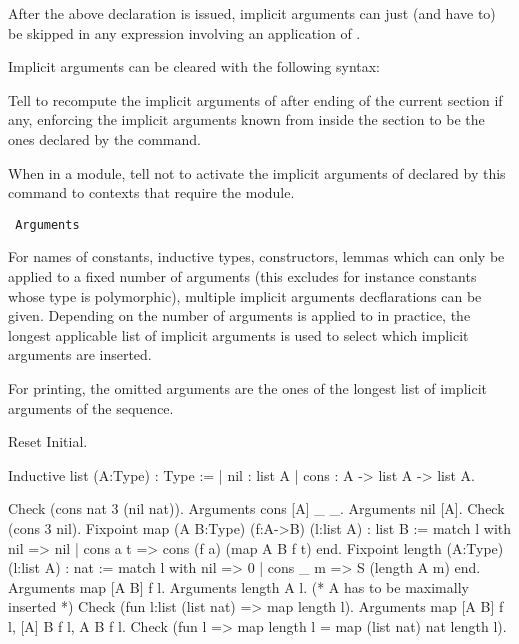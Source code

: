 After the above declaration is issued, implicit arguments can just (and
have to) be skipped in any expression involving an application of
{\qualid}.

Implicit arguments can be cleared with the following syntax:

\begin{quote}
{}
\end{quote}

\begin{Variants}
\item {}

Tell to recompute the implicit arguments of {\qualid} after ending of
the current section if any, enforcing the implicit arguments known
from inside the section to be the ones declared by the command.

\item {}

When in a module, tell not to activate the implicit arguments of
{\qualid} declared by this command to contexts that require the
module.

\item {\tt {} Arguments {\qualid} \sequence{\nelist{\possiblybracketedident}{}}{,}}

For names of constants, inductive types, constructors, lemmas which
can only be applied to a fixed number of arguments (this excludes for
instance constants whose type is polymorphic), multiple 
implicit arguments decflarations can be given. 
Depending on the number of arguments {\qualid} is applied
to in practice, the longest applicable list of implicit arguments is
used to select which implicit arguments are inserted.

For printing, the omitted arguments are the ones of the longest list
of implicit arguments of the sequence.

\end{Variants}

\Example
\begin{coq_eval}
Reset Initial.
\end{coq_eval}
\begin{coq_example*}
Inductive list (A:Type) : Type :=
 | nil : list A 
 | cons : A -> list A -> list A.
\end{coq_example*}
\begin{coq_example}
Check (cons nat 3 (nil nat)).
Arguments cons [A] _ _.
Arguments nil [A].
Check (cons 3 nil).
Fixpoint map (A B:Type) (f:A->B) (l:list A) : list B :=
  match l with nil => nil | cons a t => cons (f a) (map A B f t) end.
Fixpoint length (A:Type) (l:list A) : nat :=
  match l with nil => 0 | cons _ m => S (length A m) end.
Arguments map [A B] f l.
Arguments length {A} l. (* A has to be maximally inserted *)
Check (fun l:list (list nat) => map length l).
Arguments map [A B] f l, [A] B f l, A B f l.
Check (fun l => map length l = map (list nat) nat length l).
\end{coq_example}

